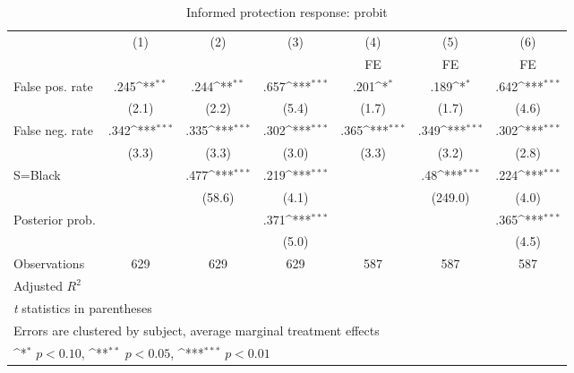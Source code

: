 \begin{table}[htbp]\centering
\def\sym#1{\ifmmode^{#1}\else\(^{#1}\)\fi}
\caption{Informed protection response: probit}
\begin{tabular}{l*{6}{c}}
\hline\hline
                &\multicolumn{1}{c}{(1)}&\multicolumn{1}{c}{(2)}&\multicolumn{1}{c}{(3)}&\multicolumn{1}{c}{(4)}&\multicolumn{1}{c}{(5)}&\multicolumn{1}{c}{(6)}\\
                &\multicolumn{1}{c}{}&\multicolumn{1}{c}{}&\multicolumn{1}{c}{}&\multicolumn{1}{c}{FE}&\multicolumn{1}{c}{FE}&\multicolumn{1}{c}{FE}\\
\hline
False pos. rate &     .245\sym{**} &     .244\sym{**} &     .657\sym{***}&     .201\sym{*}  &     .189\sym{*}  &     .642\sym{***}\\
                &    (2.1)         &    (2.2)         &    (5.4)         &    (1.7)         &    (1.7)         &    (4.6)         \\
False neg. rate &     .342\sym{***}&     .335\sym{***}&     .302\sym{***}&     .365\sym{***}&     .349\sym{***}&     .302\sym{***}\\
                &    (3.3)         &    (3.3)         &    (3.0)         &    (3.3)         &    (3.2)         &    (2.8)         \\
S=Black         &                  &     .477\sym{***}&     .219\sym{***}&                  &      .48\sym{***}&     .224\sym{***}\\
                &                  &   (58.6)         &    (4.1)         &                  &  (249.0)         &    (4.0)         \\
Posterior prob. &                  &                  &     .371\sym{***}&                  &                  &     .365\sym{***}\\
                &                  &                  &    (5.0)         &                  &                  &    (4.5)         \\
\hline
Observations    &      629         &      629         &      629         &      587         &      587         &      587         \\
Adjusted \(R^{2}\)&                  &                  &                  &                  &                  &                  \\
\hline\hline
\multicolumn{7}{l}{\footnotesize \textit{t} statistics in parentheses}\\
\multicolumn{7}{l}{\footnotesize Errors are clustered by subject, average marginal treatment effects}\\
\multicolumn{7}{l}{\footnotesize \sym{*} \(p<0.10\), \sym{**} \(p<0.05\), \sym{***} \(p<0.01\)}\\
\end{tabular}
\end{table}
